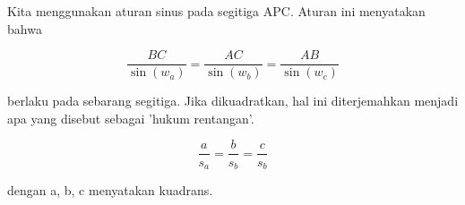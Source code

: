 \documentclass{article}
\newenvironment{eulernotebook}{\par}{\par}
\newenvironment{eulercomment}{\par\medskip}{\par\medskip}
\newenvironment{eulerformula}{}{}
\begin{document}
\begin{eulernotebook}
\begin{eulercomment}
\begin{eulercomment}
\begin{eulercomment}
Kita menggunakan aturan sinus pada segitiga APC. Aturan ini menyatakan
bahwa

\end{eulercomment}
\begin{eulerformula}
\[
\frac{BC}{\sin(w_a)} = \frac{AC}{\sin(w_b)} = \frac{AB}{\sin(w_c)}
\]
\end{eulerformula}
\begin{eulercomment}
berlaku pada sebarang segitiga. Jika dikuadratkan, hal ini
diterjemahkan menjadi apa yang disebut sebagai 'hukum rentangan'.

\end{eulercomment}
\begin{eulerformula}
\[
\frac{a}{s_a} = \frac{b}{s_b} = \frac{c}{s_b}
\]
\end{eulerformula}
\begin{eulercomment}
dengan a, b, c menyatakan kuadrans.


\end{eulercomment}
\end{eulercomment}
\end{eulercomment}
\end{eulernotebook}
\end{document}
